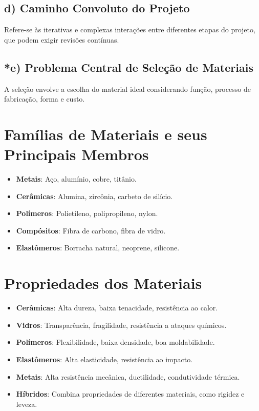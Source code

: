 \subsection*{d) Caminho Convoluto do Projeto}
Refere-se às iterativas e complexas interações entre diferentes etapas do projeto, que podem exigir revisões contínuas.

\subsection{*e) Problema Central de Seleção de Materiais}
A seleção envolve a escolha do material ideal considerando função, processo de fabricação, forma e custo.

\section{Famílias de Materiais e seus Principais Membros}
\begin{itemize}
    \item \textbf{Metais}: Aço, alumínio, cobre, titânio.
    \item \textbf{Cerâmicas}: Alumina, zircônia, carbeto de silício.
    \item \textbf{Polímeros}: Polietileno, polipropileno, nylon.
    \item \textbf{Compósitos}: Fibra de carbono, fibra de vidro.
    \item \textbf{Elastômeros}: Borracha natural, neoprene, silicone.
\end{itemize}

\section{Propriedades dos Materiais}
\begin{itemize}
    \item \textbf{Cerâmicas}: Alta dureza, baixa tenacidade, resistência ao calor.
    \item \textbf{Vidros}: Transparência, fragilidade, resistência a ataques químicos.
    \item \textbf{Polímeros}: Flexibilidade, baixa densidade, boa moldabilidade.
    \item \textbf{Elastômeros}: Alta elasticidade, resistência ao impacto.
    \item \textbf{Metais}: Alta resistência mecânica, ductilidade, condutividade térmica.
    \item \textbf{Híbridos}: Combina propriedades de diferentes materiais, como rigidez e leveza.
\end{itemize}

